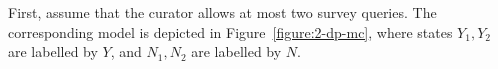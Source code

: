 \begin{example}
  First, assume that the curator allows at most two survey queries. The corresponding model is depicted in Figure~\ref{figure:2-dp-mc}, where states $Y_1,Y_2$ are labelled by $Y$, and $N_1,N_2$ are labelled by $N$.
\end{example}



